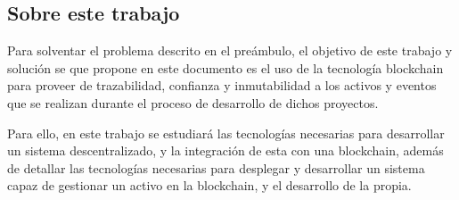\subsection{Sobre este trabajo}

Para solventar el problema descrito en el preámbulo, el objetivo de este trabajo y solución se que propone en este documento es el uso de la tecnología blockchain para proveer de trazabilidad, confianza y inmutabilidad a los activos y eventos que se realizan durante el proceso de desarrollo de dichos proyectos.

\bigskip

Para ello, en este trabajo se estudiará las tecnologías necesarias para desarrollar un sistema descentralizado, y la integración de esta con una blockchain, además de detallar las tecnologías necesarias para desplegar y desarrollar un sistema capaz de gestionar un activo en la blockchain, y el desarrollo de la propia.
